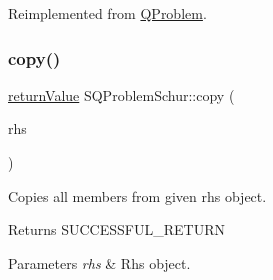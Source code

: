 Reimplemented from \hyperlink{class_q_problem_a0708ec4315696dd5462406cd0910bee2}{Q\+Problem}.

\mbox{\label{class_s_q_problem_schur_a36259e97b43141dd9400cdfc22a0eca6}} 
\subsubsection{\texorpdfstring{copy()}{copy()}}
{\footnotesize\ttfamily \hyperlink{_message_handling_8hpp_a81d556f613bfbabd0b1f9488c0fa865e}{return\+Value} S\+Q\+Problem\+Schur\+::copy (\begin{DoxyParamCaption}\item[{const \hyperlink{class_s_q_problem_schur}{S\+Q\+Problem\+Schur} \&}]{rhs }\end{DoxyParamCaption})\hspace{0.3cm}{\ttfamily [protected]}}

Copies all members from given rhs object. \begin{DoxyReturn}{Returns}
S\+U\+C\+C\+E\+S\+S\+F\+U\+L\+\_\+\+R\+E\+T\+U\+RN 
\end{DoxyReturn}

\begin{DoxyParams}{Parameters}
{\em rhs} & Rhs object. \\
\hline
\end{DoxyParams}
\mbox{\label{class_s_q_problem_schur_ad64e66192c758c6dde527b2ec1b27725}} 
